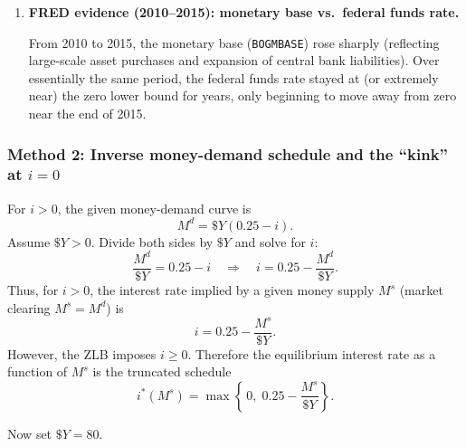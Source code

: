 \documentclass[12pt]{article}
\begin{document}
\begin{enumerate}[label=(\alph*)]
Formally, for \(\$Y=80\), once \(M^s\ge 20\), the market can clear at \(i=0\) with
\[
M^d(i=0,\$Y=80)\ \text{adjusting to equal}\ M^s.
\]
Thus:
\[
\boxed{\,\text{The central bank can increase }M^s\text{ further, but }i\text{ remains at }0.\,}
\]
This is the sense in which \emph{conventional} monetary policy (operating through reductions in \(i\)) becomes ineffective at the ZLB.

\item \textbf{FRED evidence (2010--2015): monetary base vs.\ federal funds rate.}

From 2010 to 2015, the monetary base (\texttt{BOGMBASE}) rose sharply (reflecting large-scale asset purchases and expansion of central bank liabilities). Over essentially the same period, the federal funds rate stayed at (or extremely near) the zero lower bound for years, only beginning to move away from zero near the end of 2015.

\begin{center}
\end{center}
\end{enumerate}

\subsubsection*{Method 2: Inverse money-demand schedule and the ``kink'' at \(i=0\)}
For \(i>0\), the given money-demand curve is
\[
M^d = \$Y(0.25-i).
\]
Assume \(\$Y>0\). Divide both sides by \(\$Y\) and solve for \(i\):
\[
\frac{M^d}{\$Y} = 0.25-i
\quad\Longrightarrow\quad
i = 0.25-\frac{M^d}{\$Y}.
\]
Thus, for \(i>0\), the interest rate implied by a given money supply \(M^s\) (market clearing \(M^s=M^d\)) is
\[
i = 0.25-\frac{M^s}{\$Y}.
\]
However, the ZLB imposes \(i\ge 0\). Therefore the equilibrium interest rate as a function of \(M^s\) is the truncated schedule
\[
i^*(M^s)=\max\!\left\{\,0,\;0.25-\frac{M^s}{\$Y}\right\}.
\]

Now set \(\$Y=80\).
\end{document}
